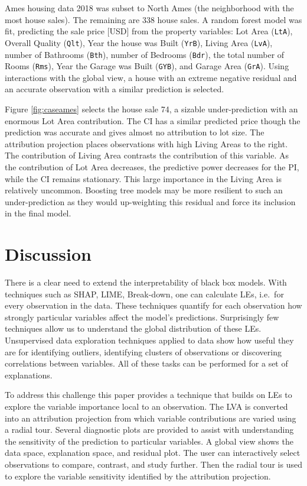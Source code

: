 \documentclass[
]{sn-jnl}
\begin{document}
Ames housing data 2018 \citep{de_cock_ames_2011, prevek18_ames_2018} was
subset to North Ames (the neighborhood with the most house sales). The
remaining are 338 house sales. A random forest model was fit, predicting
the sale price {[}USD{]} from the property variables: Lot Area
(\texttt{LtA}), Overall Quality (\texttt{Qlt}), Year the house was Built
(\texttt{YrB}), Living Area (\texttt{LvA}), number of Bathrooms
(\texttt{Bth}), number of Bedrooms (\texttt{Bdr}), the total number of
Rooms (\texttt{Rms}), Year the Garage was Built (\texttt{GYB}), and
Garage Area (\texttt{GrA}). Using interactions with the global view, a
house with an extreme negative residual and an accurate observation with
a similar prediction is selected.

Figure \ref{fig:caseames} selects the house sale 74, a sizable
under-prediction with an enormous Lot Area contribution. The CI has a
similar predicted price though the prediction was accurate and gives
almost no attribution to lot size. The attribution projection places
observations with high Living Areas to the right. The contribution of
Living Area contrasts the contribution of this variable. As the
contribution of Lot Area decreases, the predictive power decreases for
the PI, while the CI remains stationary. This large importance in the
Living Area is relatively uncommon. Boosting tree models may be more
resilient to such an under-prediction as they would up-weighting this
residual and force its inclusion in the final model.

\hypertarget{sec:cheemdiscussion}{%
\section{Discussion}\label{sec:cheemdiscussion}}

There is a clear need to extend the interpretability of black box
models. With techniques such as SHAP, LIME, Break-down, one can
calculate LEs, i.e.~for every observation in the data. These techniques
quantify for each observation how strongly particular variables affect
the model's predictions. Surprisingly few techniques allow us to
understand the global distribution of these LEs. Unsupervised data
exploration techniques applied to data show how useful they are for
identifying outliers, identifying clusters of observations or
discovering correlations between variables. All of these tasks can be
performed for a set of explanations.

To address this challenge this paper provides a technique that builds on
LEs to explore the variable importance local to an observation. The LVA
is converted into an attribution projection from which variable
contributions are varied using a radial tour. Several diagnostic plots
are provided to assist with understanding the sensitivity of the
prediction to particular variables. A global view shows the data space,
explanation space, and residual plot. The user can interactively select
observations to compare, contrast, and study further. Then the radial
tour is used to explore the variable sensitivity identified by the
attribution projection.
\end{document}
